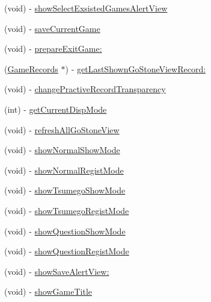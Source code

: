 \begin{DoxyCompactItemize}
\item 
(void) -\/ \hyperlink{interface_abstract_record_view_controller_a1c50772482cb391a0317ac01b8fbdc51}{showSelectExsistedGamesAlertView}
\item 
(void) -\/ \hyperlink{interface_abstract_record_view_controller_a6ac797433b51ead28bcad34f1ca007b3}{saveCurrentGame}
\item 
(void) -\/ \hyperlink{interface_abstract_record_view_controller_a54bd7e7c604701e3d33f3813693e9847}{prepareExitGame:}
\item 
(\hyperlink{interface_game_records}{GameRecords} $\ast$) -\/ \hyperlink{interface_abstract_record_view_controller_a826af0d182748e78f8798d2fe5cc2b6d}{getLastShownGoStoneViewRecord:}
\item 
(void) -\/ \hyperlink{interface_abstract_record_view_controller_a019625ec4026858785a1579676a1f69b}{changePractiveRecordTransparency}
\item 
(int) -\/ \hyperlink{interface_abstract_record_view_controller_a65bf13a50920e352d60dd6b8985fab9b}{getCurrentDispMode}
\item 
(void) -\/ \hyperlink{interface_abstract_record_view_controller_a40384d4a2a0528073f206b2f345532e0}{refreshAllGoStoneView}
\item 
(void) -\/ \hyperlink{interface_abstract_record_view_controller_a27a4c02c17337cece7bc250de2449f96}{showNormalShowMode}
\item 
(void) -\/ \hyperlink{interface_abstract_record_view_controller_a5709ef9f7c65e524822ec7765f8c4c4b}{showNormalRegistMode}
\item 
(void) -\/ \hyperlink{interface_abstract_record_view_controller_ae0a771f6cbfe223a0b3d72fab37e12a8}{showTsumegoShowMode}
\item 
(void) -\/ \hyperlink{interface_abstract_record_view_controller_a3af87d17d486ae3ac03adb8c6bf76c14}{showTsumegoRegistMode}
\item 
(void) -\/ \hyperlink{interface_abstract_record_view_controller_a55f6add41b02e10e1e89a6fca71c18a5}{showQuestionShowMode}
\item 
(void) -\/ \hyperlink{interface_abstract_record_view_controller_a6405ef4502d057e9778a265fa63230f4}{showQuestionRegistMode}
\item 
(void) -\/ \hyperlink{interface_abstract_record_view_controller_a36ee966347c83a924feccd85aa6b2826}{showSaveAlertView:}
\item 
(void) -\/ \hyperlink{interface_abstract_record_view_controller_abf6f1c4329169c26f22e85091b790f3c}{showGameTitle}
\item 

\end{DoxyCompactItemize}
